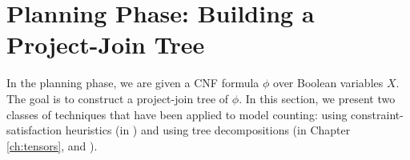 \section{Planning Phase: Building a Project-Join Tree}
\label{sec_planning}

In the planning phase, we are given a CNF formula $\phi$ over Boolean variables $X$.
The goal is to construct a project-join tree of $\phi$.
In this section, we present two classes of techniques that have been applied to model counting:
using constraint-satisfaction heuristics (in \cite{DPV20}) and using tree decompositions (in Chapter \ref{ch:tensors}, and \cite{fichte2020exploiting}). %






